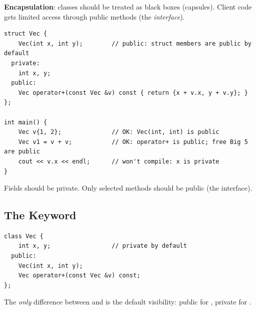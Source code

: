 \begin{definition}
\textbf{Encapsulation}: classes should be treated as black boxes (capsules).
Client code gets limited access through public methods (the \emph{interface}).
\end{definition}

\begin{lstlisting}[style=cpp]
struct Vec {
    Vec(int x, int y);        // public: struct members are public by default
  private:
    int x, y;
  public:
    Vec operator+(const Vec &v) const { return {x + v.x, y + v.y}; }
};

int main() {
    Vec v{1, 2};              // OK: Vec(int, int) is public
    Vec v1 = v + v;           // OK: operator+ is public; free Big 5 are public
    cout << v.x << endl;      // won't compile: x is private
}
\end{lstlisting}

\begin{important}[Advice]
Fields should be private. Only selected methods should be public (the
interface).
\end{important}

\subsection{The  Keyword}
\begin{lstlisting}[style=cpp]
class Vec {
    int x, y;                 // private by default
  public:
    Vec(int x, int y);
    Vec operator+(const Vec &v) const;
};
\end{lstlisting}
The \emph{only} difference between  and  is the default
visibility: public for , private for .

